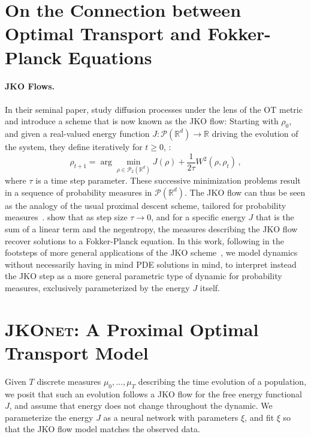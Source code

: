 \section[On the Connection between OT and Fokker-Planck Equations]{On the Connection between Optimal Transport and Fokker-Planck Equations}

\paragraph{JKO Flows.}
In their seminal paper, \citet{jordan1998variational} study diffusion processes under the lens of the OT metric \citep[see also][]{ambrosio2006gradient} and introduce a scheme that is now known as the JKO flow: Starting with $\rho_0$, and given a real-valued energy function $J:\mathcal{P}(\mathbb{R}^d)\rightarrow \mathbb{R}$ driving the evolution of the system, they define iteratively for $t\geq 0$, :
\begin{equation} \label{eq:jko}
    \rho_{t+1} = \arg \min_{\rho\in \mathcal{P}_2(\mathbb{R}^d)} J(\rho) + \frac{1}{2\tau} W^2(\rho, \rho_{t})\,,
\end{equation}
where $\tau$ is a time step parameter. These successive minimization problems result in a sequence of probability measures in $\mathcal{P}(\mathbb{R}^d)$. The JKO flow can thus be seen as the analogy of the usual proximal descent scheme, tailored for probability measures~\citep[p.285]{santambrogio2015optimal}. \citet{jordan1998variational} show that as step size $\tau \rightarrow 0$, and for a specific energy $J$ that is the sum of a linear term and the negentropy, the measures describing the JKO flow recover solutions to a Fokker-Planck equation. In this work, following in the footsteps of more general applications of the JKO scheme~\citep[\S4.8]{santambrogio2017euclidean}, we model dynamics without necessarily having in mind PDE solutions in mind, to interpret instead the JKO step as a more general parametric type of dynamic for probability measures, exclusively parameterized by the energy $J$ itself.


\section{\textsc{JKOnet}: A Proximal Optimal Transport Model} 

Given $T$ discrete measures $\mu_0, \dots, \mu_T$ describing the time evolution of a population, we posit that such an evolution follows a JKO flow for the free energy functional $J$, and assume that energy does not change throughout the dynamic. We parameterize the energy $J$ as a neural network with parameters $\xi$, and fit $\xi$ so that the JKO flow model matches the observed data. 

